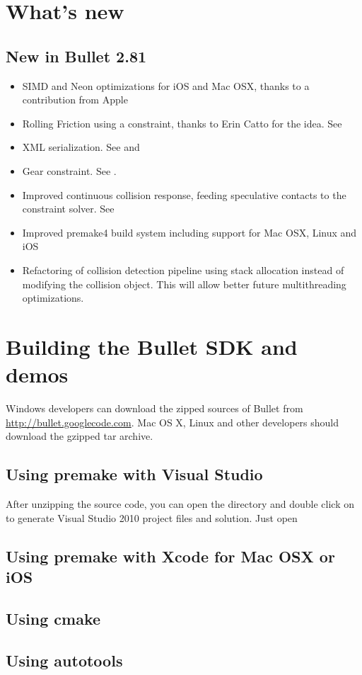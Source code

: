 \section{What's new}
\subsection{New in Bullet 2.81}
\begin{itemize}
	\item SIMD and Neon optimizations for iOS and Mac OSX, thanks to a contribution from Apple
	\item Rolling Friction using a constraint, thanks to Erin Catto for the idea. See 
	\item XML serialization. See  and 
	\item Gear constraint. See .
	\item Improved continuous collision response, feeding speculative contacts to the constraint solver. See 
	\item Improved premake4 build system including support for Mac OSX, Linux and iOS
	\item Refactoring of collision detection pipeline using stack allocation instead of modifying the collision object. This will allow better future multithreading optimizations.
\end{itemize}

\section{Building the Bullet SDK and demos}
Windows developers can download the zipped sources of Bullet from \url{http://bullet.googlecode.com}. Mac OS X, Linux and other developers should download the gzipped tar archive.
\subsection{Using premake with Visual Studio}
After unzipping the source code, you can open the  directory and double click on  to generate Visual Studio 2010 project files and solution. Just open 
\subsection{Using premake with Xcode for Mac OSX or iOS}

\subsection{Using cmake}

\subsection{Using autotools}
